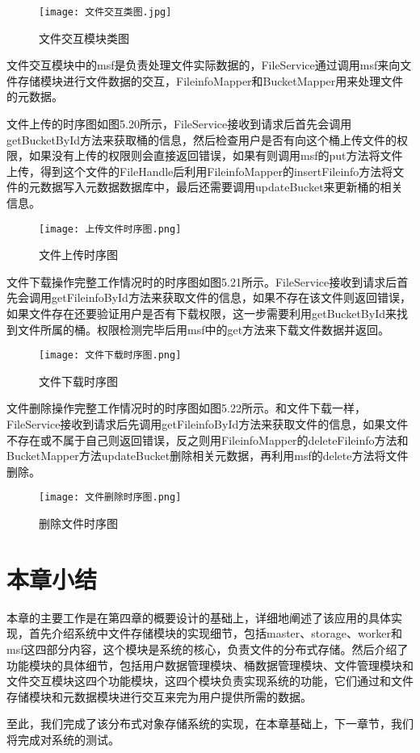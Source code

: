 \begin{figure}
  \centering
  \texttt{[image: 文件交互类图.jpg]}
  \caption{文件交互模块类图}
\end{figure}

文件交互模块中的msf是负责处理文件实际数据的，FileService通过调用msf来向文件存储模块进行文件数据的交互，FileinfoMapper和BucketMapper用来处理文件的元数据。

文件上传的时序图如图5.20所示，FileService接收到请求后首先会调用getBucketById方法来获取桶的信息，然后检查用户是否有向这个桶上传文件的权限，如果没有上传的权限则会直接返回错误，如果有则调用msf的put方法将文件上传，得到这个文件的FileHandle后利用FileinfoMapper的insertFileinfo方法将文件的元数据写入元数据数据库中，最后还需要调用updateBucket来更新桶的相关信息。

\begin{figure}
  \centering
  \texttt{[image: 上传文件时序图.png]}
  \caption{文件上传时序图}
\end{figure}

文件下载操作完整工作情况时的时序图如图5.21所示。FileService接收到请求后首先会调用getFileinfoById方法来获取文件的信息，如果不存在该文件则返回错误，如果文件存在还要验证用户是否有下载权限，这一步需要利用getBucketById来找到文件所属的桶。权限检测完毕后用msf中的get方法来下载文件数据并返回。

\begin{figure}
  \centering
  \texttt{[image: 文件下载时序图.png]}
  \caption{文件下载时序图}
\end{figure}

文件删除操作完整工作情况时的时序图如图5.22所示。和文件下载一样，FileService接收到请求后先调用getFileinfoById方法来获取文件的信息，如果文件不存在或不属于自己则返回错误，反之则用FileinfoMapper的deleteFileinfo方法和BucketMapper方法updateBucket删除相关元数据，再利用msf的delete方法将文件删除。

\begin{figure}
  \centering
  \texttt{[image: 文件删除时序图.png]}
  \caption{删除文件时序图}
\end{figure}

\section{本章小结}%
本章的主要工作是在第四章的概要设计的基础上，详细地阐述了该应用的具体实现，首先介绍系统中文件存储模块的实现细节，包括master、storage、worker和msf这四部分内容，这个模块是系统的核心，负责文件的分布式存储。然后介绍了功能模块的具体细节，包括用户数据管理模块、桶数据管理模块、文件管理模块和文件交互模块这四个功能模块，这四个模块负责实现系统的功能，它们通过和文件存储模块和元数据模块进行交互来完为用户提供所需的数据。

至此，我们完成了该分布式对象存储系统的实现，在本章基础上，下一章节，我们将完成对系统的测试。 

